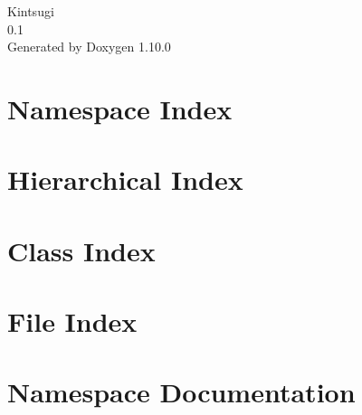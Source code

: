 \documentclass[twoside]{book}
\newcommand{\+}{\discretionary{\mbox{\scriptsize$\hookleftarrow$}}{}{}}
\newcommand{\clearemptydoublepage}{%
    \newpage{\pagestyle{empty}\cleardoublepage}%
  }
\begin{document}
  \raggedbottom
    \hypersetup{pageanchor=false,
                bookmarksnumbered=true,
                pdfencoding=unicode
               }
  \begin{titlepage}
  \vspace*{7cm}
  \begin{center}%
  {\Large Kintsugi}\\
  [1ex]\large 0.\+1 \\
  \vspace*{1cm}
  {\large Generated by Doxygen 1.10.0}\\
  \end{center}
  \end{titlepage}
  \clearemptydoublepage
  \tableofcontents
  \clearemptydoublepage
  \hypersetup{pageanchor=true}
\chapter{Namespace Index}

\chapter{Hierarchical Index}

\chapter{Class Index}

\chapter{File Index}

\chapter{Namespace Documentation}


















\end{document}
